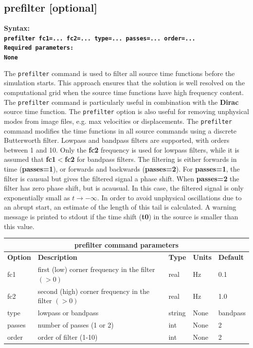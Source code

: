 \documentclass[11pt]{report}
\begin{document}
\subsection{prefilter [optional]}\label{keyword:prefilter}
\begin{flushleft}
\bf
Syntax:\\
\tt prefilter fc1=... fc2=... type=... passes=... order=...\\
\bf 
Required parameters:\\
\rm 
None
\end{flushleft}
The \verb+prefilter+ command is used to filter all source time functions before the simulation
starts. This approach ensures that the solution is well resolved on the computational grid when the
source time functions have high frequency content. The \verb+prefilter+ command is particularly
useful in combination with the {\bf Dirac} source time function. The \verb+prefilter+ option is also
useful for removing unphysical modes from image files, e.g. max velocities or displacements.  The
\verb+prefilter+ command modifies the time functions in all source commands using a discrete
Butterworth filter.  Lowpass and bandpass filters are supported, with orders between 1 and 10. Only
the {\bf fc2} frequency is used for lowpass filters, while it is assumed that {\bf fc1}$<${\bf fc2}
for bandpass filters. The filtering is either forwards in time ({\bf passes=1}), or forwards and
backwards ({\bf passes=2}). For {\bf passes=1}, the filter is causual but gives the filtered signal
a phase shift. When {\bf passes=2} the filter has zero phase shift, but is acausual. In this case,
the filtered signal is only exponentially small as $t\to-\infty$. In order to avoid unphysical
oscillations due to an abrupt start, an estimate of the length of this tail is calculated. A
warning message is printed to stdout if the time shift ({\bf t0}) in the source  is smaller than this value.
\begin{center}
\begin{tabular}{|l|p{8cm}|l|l|l|} \hline
\multicolumn{5}{|c|}{\bf prefilter command parameters}\\ \hline
\bf{Option} & \bf{Description} & \bf{Type} & \bf{Units} & \bf{Default} \\ 
\hline \hline
fc1 & first (low) corner frequency in the filter $(>0)$   & real  & Hz & 0.1 \\ \hline
fc2 & second (high) corner frequency in the filter $(>0)$ & real  & Hz & 1.0 \\ \hline
type & lowpass or bandpass                                & string & None & bandpass \\ \hline
passes & number of passes (1 or 2) & int & None & 2 \\ \hline
order  & order of filter (1-10) & int & None & 2 \\ \hline
\end{tabular}
\end{center}
\end{document}
